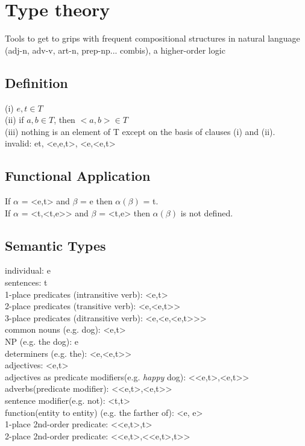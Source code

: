 \section{Type theory}
{\tiny Tools to get to grips with frequent compositional structures in natural language (adj-n, adv-v, art-n, prep-np... combis), a higher-order logic}
\subsection*{Definition}
{\scriptsize (i) $e, t \in T$\\
(ii) if $a, b \in T$, then $<a, b> \in T$\\
(iii) nothing is an element of T except on the basis of clauses (i) and (ii).\\
invalid: et, <e,e,t>, <e,<e,t>}
\subsection*{Functional Application}
{\scriptsize If $\alpha$ = <e,t> and $\beta$ = e then $\alpha (\beta)$ = t. \\
If $\alpha$ = <t,<t,e>> and $\beta$ = <t,e> then $\alpha (\beta)$ is not defined.}
\subsection*{Semantic Types}
{\scriptsize individual: e \\
sentences: t \\
1-place predicates (intransitive verb): <e,t> \\
2-place predicates (transitive verb): <e,<e,t>> \\
3-place predicates (ditransitive verb): <e,<e,<e,t>>> \\
common nouns (e.g. dog): <e,t> \\
NP (e.g. the dog): e \\
determiners (e.g. the): <e,<e,t>> \\
adjectives: <e,t> \\
adjectives as predicate modifiers(e.g. \emph{happy} dog): <<e,t>,<e,t>> \\
adverbs(predicate modifier): <<e,t>,<e,t>> \\
sentence modifier(e.g. not): <t,t> \\
function(entity to entity) (e.g. the farther of): <e, e> \\
1-place 2nd-order predicate: <<e,t>,t> \\
2-place 2nd-order predicate: <<e,t>,<<e,t>,t>>}
